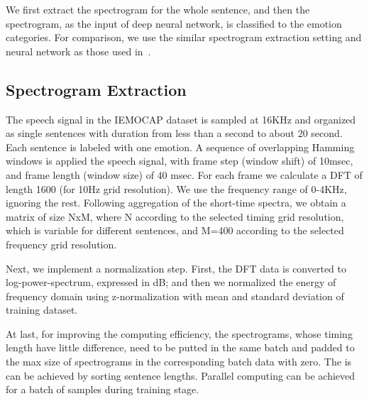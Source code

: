\documentclass[a4paper]{article}
\begin{document}
We first extract the spectrogram for the whole sentence, and then the spectrogram, as the input of deep neural network, is classified to the emotion categories. For comparison, we use the similar spectrogram extraction setting and neural network as those used in~\cite{satt2017}.

\subsection{Spectrogram Extraction}
\label{ssec:spectrogram_extraction}



The speech signal in the IEMOCAP dataset is sampled at 16KHz and organized as single sentences with duration from less than a second to about 20 second. Each sentence is labeled with one emotion. A sequence of overlapping Hamming windows is applied the speech signal, with frame step (window shift) of 10msec, and frame length (window size) of 40 msec. For each frame we calculate a DFT of length 1600 (for 10Hz grid resolution). We use the frequency range of 0-4KHz, ignoring the rest. Following aggregation of the short-time spectra, we obtain a matrix of size NxM, where N according to the selected timing grid resolution, which is variable for different sentences,  and M=400 according to the selected frequency grid resolution.

Next, we implement a normalization step. First, the DFT data is converted to log-power-spectrum, expressed in dB; and then we normalized the energy of frequency domain using z-normalization with mean and standard deviation of training dataset.

At last, for improving the computing efficiency, the spectrograms, whose timing length have little difference, need to be putted in the same batch and padded to the max size of spectrograms in the corresponding batch data with zero. The is can be achieved by sorting sentence lengths. Parallel computing can be achieved for a batch of samples during training stage.
\end{document}

